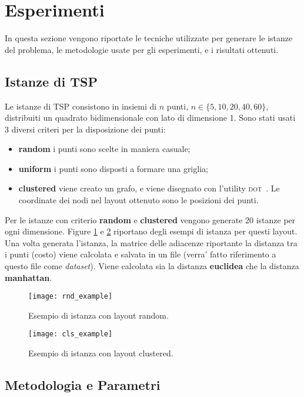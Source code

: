 \documentclass[
12pt, %
a4paper, %
oneside, %
headinclude,footinclude, %
BCOR5mm, %
]{scrartcl}
\begin{document}
\section{Esperimenti}\label{sec:exp}
In questa sezione vengono riportate le tecniche utilizzate per generare le istanze del problema, le metodologie usate per gli esperimenti, e i risultati ottenuti.

\subsection{Istanze di TSP}
Le istanze di TSP consistono in insiemi di $n$ punti, $n \in \{5, 10, 20, 40, 60\}$, distribuiti un quadrato bidimensionale con lato di dimensione 1. Sono stati usati 3 diversi criteri per la disposizione dei punti:
\begin{itemize}
	\item \textbf{random} i punti sono scelte in maniera casuale;
	\item \textbf{uniform} i punti sono disposti a formare una griglia;
	\item \textbf{clustered} viene creato un grafo, e viene disegnato con l'utility \textsc{dot}~\cite{gansner2006drawing}. Le coordinate dei nodi nel layout ottenuto sono le posizioni dei punti.
\end{itemize}
Per le istanze con criterio \textbf{random} e \textbf{clustered} vengono generate 20 istanze per ogni dimensione. Figure \ref{fig:rnd} e \ref{fig:cls} riportano degli esempi di istanza per questi layout. Una volta generata l'istanza, la matrice delle adiacenze riportante la distanza tra i punti (costo) viene calcolata e salvata in un file (verra' fatto riferimento a questo file come \textit{dataset}). Viene calcolata sia la distanza \textbf{euclidea} che la distanza \textbf{manhattan}.

\begin{figure}[H]
	\centering
	\texttt{[image: rnd\_example]}
	\caption[random]{Esempio di istanza con layout random.}
	\label{fig:rnd}
\end{figure}

\begin{figure}[H]
	\centering
	\texttt{[image: cls\_example]}
	\caption[clustered]{Esempio di istanza con layout clustered.}
	\label{fig:cls}
\end{figure}

\subsection{Metodologia e Parametri}
\end{document}
